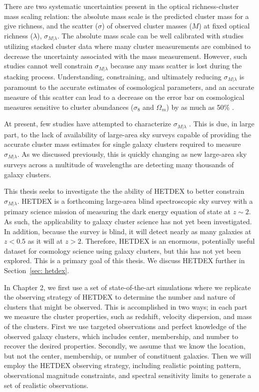There are two systematic uncertainties present in the optical richness-cluster mass scaling relation: the absolute mass scale is the predicted cluster mass for a give richness, and the scatter ($\sigma$) of observed cluster masses ($M$) at fixed optical richness ($\lambda$), $\sigma_{M|\lambda}$. The absolute mass scale can be well calibrated with studies utilizing stacked cluster data  where many cluster measurements are combined to decrease the uncertainty associated with the mass measurement. However, such studies cannot well constrain $\sigma_{M|\lambda}$ because any mass scatter is lost during the stacking process. Understanding, constraining, and ultimately reducing $\sigma_{M|\lambda}$ is paramount to the accurate estimates of cosmological parameters, and an accurate measure of this scatter can lead to a decrease on the error bar on cosmological measures sensitive to cluster abundances ($\sigma_8$ and $\Omega_m$) by as much as 50\% \citep{Rozo2010}.

At present, few studies have attempted to characterize $\sigma_{M|\lambda}$ \citep{Rozo2014,Rozo2015, Saro2015, Rykoff2016}. This is due, in large part, to the lack of availability of large-area sky surveys capable of providing the accurate cluster mass estimates for single galaxy clusters required to measure $\sigma_{M|\lambda}$. As we discussed previously, this is quickly changing as new large-area sky surveys across a multitude of wavelengths are detecting many thousands of galaxy clusters. 

This thesis seeks to investigate the the ability of HETDEX to better constrain $\sigma_{M|\lambda}$. HETDEX is a forthcoming large-area blind spectroscopic sky survey with a primary science mission of measuring the dark energy equation of state at $z\sim2$. As such, the applicability to galaxy cluster science has not yet been investigated. In addition, because the survey is blind, it will detect nearly as many galaxies at $z<0.5$ as it will at $z>2.$ Therefore, HETDEX is an enormous, potentially useful dataset for cosmology science using galaxy clusters, but this has not yet been explored. This is a primary goal of this thesis. We discuss HETDEX further in Section~\ref{sec: hetdex}.

In Chapter 2, we first use a set of state-of-the-art simulations where we replicate the observing strategy of HETDEX to determine the number and nature of clusters that might be observed. This is accomplished in two ways; in each part we measure the cluster properties, such as redshift, velocity dispersion, and mass of the clusters. First we use targeted observations and perfect knowledge of the observed galaxy clusters, which includes center, membership, and number to recover the desired properties. Secondly, we assume that we know the location, but not the center, membership, or number of constituent galaxies. Then we will employ the HETDEX observing strategy, including realistic pointing pattern, observational magnitude constraints, and spectral sensitivity limits to generate a set of realistic observations.

